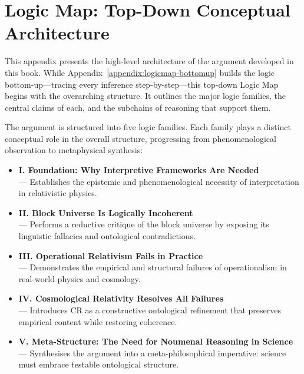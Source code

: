 \documentclass[12pt]{book}
\begin{document}
\chapter{Logic Map: Top-Down Conceptual Architecture}
\label{appendix:logicmap-topdown}

This appendix presents the high-level architecture of the argument developed in this book. While Appendix~\ref{appendix:logicmap-bottomup} builds the logic bottom-up---tracing every inference step-by-step---this top-down Logic Map begins with the overarching structure. It outlines the major logic families, the central claims of each, and the subchains of reasoning that support them.

The argument is structured into five logic families. Each family plays a distinct conceptual role in the overall structure, progressing from phenomenological observation to metaphysical synthesis:
\begin{itemize}
    \item \textbf{I. Foundation: Why Interpretive Frameworks Are Needed} \\
    --- Establishes the epistemic and phenomenological necessity of interpretation in relativistic physics.
    
    \item \textbf{II. Block Universe Is Logically Incoherent} \\
    --- Performs a reductive critique of the block universe by exposing its linguistic fallacies and ontological contradictions.
    
    \item \textbf{III. Operational Relativism Fails in Practice} \\
    --- Demonstrates the empirical and structural failures of operationalism in real-world physics and cosmology.
    
    \item \textbf{IV. Cosmological Relativity Resolves All Failures} \\
    --- Introduces CR as a constructive ontological refinement that preserves empirical content while restoring coherence.
    
    \item \textbf{V. Meta-Structure: The Need for Noumenal Reasoning in Science} \\
    --- Synthesises the argument into a meta-philosophical imperative: science must embrace testable ontological structure.
\end{itemize}
\end{document}
